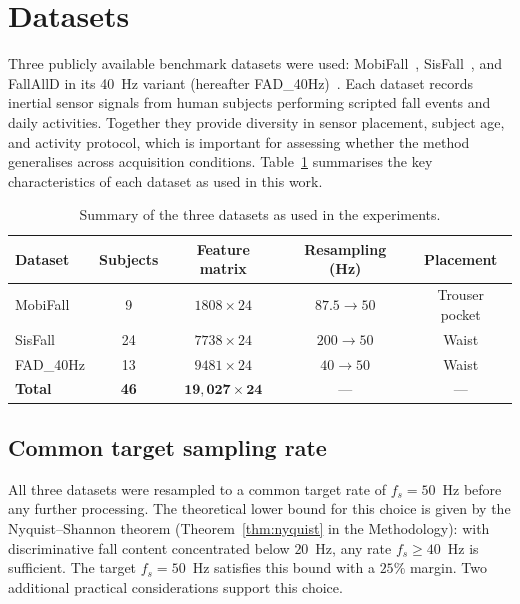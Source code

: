 \documentclass[onluarkali,ingilizce,yukseklisans,karton,LisansustuEgitim]{itutez}
\providecommand{\1}{\mathbf{1}}
\begin{document}
\section{Datasets}
\label{subsec:datasets}

Three publicly available benchmark datasets were used: MobiFall~\parencite{mobifall}, SisFall~\parencite{sisfall}, and FallAllD in its 40~Hz variant (hereafter FAD\_40Hz)~\parencite{fallalld}. Each dataset records inertial sensor signals from human subjects performing scripted fall events and daily activities. Together they provide diversity in sensor placement, subject age, and activity protocol, which is important for assessing whether the method generalises across acquisition conditions. Table~\ref{tab:dataset_summary} summarises the key characteristics of each dataset as used in this work.

\begin{table}[h!]
\centering
\caption{Summary of the three datasets as used in the experiments.}
\label{tab:dataset_summary}
\setlength{\tabcolsep}{4pt}\footnotesize
\begin{tabular}{lcccc}
\toprule
\textbf{Dataset} & \textbf{Subjects} & \textbf{Feature matrix}
  & \textbf{Resampling (Hz)} & \textbf{Placement} \\
\midrule
MobiFall   &  9 & $1808 \times 24$ & $87.5 \to 50$ & Trouser pocket \\
SisFall    & 24 & $7738 \times 24$ & $200  \to 50$ & Waist \\
FAD\_40Hz  & 13 & $9481 \times 24$ & $40   \to 50$ & Waist \\
\midrule
\textbf{Total} & \textbf{46} & $\mathbf{19{,}027 \times 24}$ & --- & --- \\
\bottomrule
\end{tabular}
\end{table}

\subsection{Common target sampling rate}
\label{subsubsec:sampling-rate}

All three datasets were resampled to a common target rate of $f_s=50$~Hz before any further processing. The theoretical lower bound for this choice is given by the Nyquist--Shannon theorem (Theorem~\ref{thm:nyquist} in the Methodology): with discriminative fall content concentrated below $20$~Hz, any rate $f_s\geq 40$~Hz is sufficient. The target $f_s=50$~Hz satisfies this bound with a $25\%$ margin. Two additional practical considerations support this choice.
\end{document}
